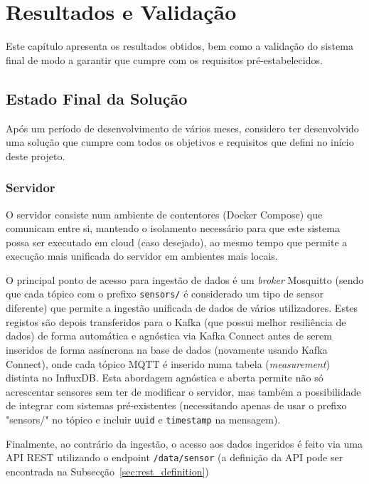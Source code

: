 \chapter{Resultados e Validação}
\label{chap:resultados}

\begin{introduction}
Este capítulo apresenta os resultados obtidos, bem como a validação do sistema final de modo a garantir que cumpre com os requisitos pré-estabelecidos.
\end{introduction}

\section{Estado Final da Solução}

Após um período de desenvolvimento de vários meses, considero ter desenvolvido uma solução que cumpre com todos os objetivos e requisitos que defini no início deste projeto.

\subsection{Servidor}

O servidor consiste num ambiente de contentores (Docker Compose) que comunicam entre si, mantendo o isolamento necessário para que este sistema possa ser executado em cloud (caso desejado), ao mesmo tempo que permite a execução mais unificada do servidor em ambientes mais locais.

O principal ponto de acesso para ingestão de dados é um \textit{broker} Mosquitto (sendo que cada tópico com o prefixo \texttt{sensors/} é considerado um tipo de sensor diferente) que permite a ingestão unificada de dados de vários utilizadores. Estes registos são depois transferidos para o Kafka (que possui melhor resiliência de dados) de forma automática e agnóstica via Kafka Connect antes de serem inseridos de forma assíncrona na base de dados (novamente usando Kafka Connect), onde cada tópico \ac{MQTT} é inserido numa tabela (\textit{measurement}) distinta no InfluxDB. Esta abordagem agnóstica e aberta permite não só acrescentar sensores sem ter de modificar o servidor, mas também a possibilidade de integrar com sistemas pré-existentes (necessitando apenas de usar o prefixo "sensors/" no tópico e incluir \texttt{uuid} e \texttt{timestamp} na mensagem).

Finalmente, ao contrário da ingestão, o acesso aos dados ingeridos é feito via uma API REST utilizando o endpoint \texttt{/data/{sensor}} (a definição da API pode ser encontrada na Subsecção~\ref{sec:rest_definition})


